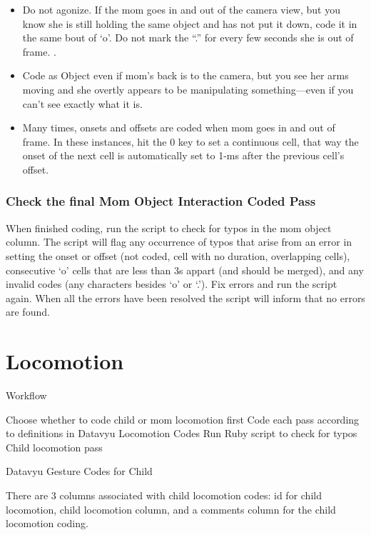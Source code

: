 \documentclass[
]{book}
\begin{document}
\begin{itemize}
\item
  Do not agonize. If the mom goes in and out of the camera view, but you know she is still holding the same object and has not put it down, code it in the same bout of `o'. Do not mark the ``.'' for every few seconds she is out of frame. .
\item
  Code as Object even if mom's back is to the camera, but you see her arms moving and she overtly appears to be manipulating something---even if you can't see exactly what it is.
\item
  Many times, onsets and offsets are coded when mom goes in and out of frame. In these instances, hit the 0 key to set a continuous cell, that way the onset of the next cell is automatically set to 1-ms after the previous cell's offset.
\end{itemize}

\hypertarget{check-the-final-mom-object-interaction-coded-pass}{%
\subsection*{Check the final Mom Object Interaction Coded Pass}\label{check-the-final-mom-object-interaction-coded-pass}}

When finished coding, run the script to check for typos in the mom object column. The script will flag any occurrence of typos that arise from an error in setting the onset or offset (not coded, cell with no duration, overlapping cells), consecutive `o' cells that are less than 3s appart (and should be merged), and any invalid codes (any characters besides `o' or `.'). Fix errors and run the script again. When all the errors have been resolved the script will inform that no errors are found.

\hypertarget{locomotion}{%
\chapter{Locomotion}\label{locomotion}}

Workflow

Choose whether to code child or mom locomotion first
Code each pass according to definitions in Datavyu Locomotion Codes
Run Ruby script to check for typos
Child locomotion pass

Datavyu Gesture Codes for Child

There are 3 columns associated with child locomotion codes: id for child locomotion, child locomotion column, and a comments column for the child locomotion coding.
\end{document}
